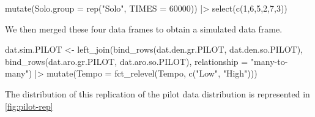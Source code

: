 \documentclass[
  bookmarksnumbered]{article}
\newenvironment{Shaded}{\begin{snugshade}}{\end{snugshade}}
\newcommand{\AttributeTok}[1]{\textcolor[rgb]{0.80,0.80,0.80}{#1}}
\newcommand{\DecValTok}[1]{\textcolor[rgb]{0.86,0.86,0.80}{#1}}
\newcommand{\FunctionTok}[1]{\textcolor[rgb]{0.94,0.94,0.56}{#1}}
\newcommand{\NormalTok}[1]{\textcolor[rgb]{0.80,0.80,0.80}{#1}}
\newcommand{\OtherTok}[1]{\textcolor[rgb]{0.94,0.94,0.56}{#1}}
\newcommand{\SpecialCharTok}[1]{\textcolor[rgb]{0.86,0.64,0.64}{#1}}
\newcommand{\StringTok}[1]{\textcolor[rgb]{0.80,0.58,0.58}{#1}}
\begin{document}
\begin{Shaded}
\begin{Highlighting}[]
  \FunctionTok{mutate}\NormalTok{(}\AttributeTok{Solo.group =} \FunctionTok{rep}\NormalTok{(}\StringTok{"Solo"}\NormalTok{, }\AttributeTok{TIMES =} \DecValTok{60000}\NormalTok{)) }\SpecialCharTok{|\textgreater{}}
  \FunctionTok{select}\NormalTok{(}\FunctionTok{c}\NormalTok{(}\DecValTok{1}\NormalTok{,}\DecValTok{6}\NormalTok{,}\DecValTok{5}\NormalTok{,}\DecValTok{2}\NormalTok{,}\DecValTok{7}\NormalTok{,}\DecValTok{3}\NormalTok{))}
\end{Highlighting}
\end{Shaded}

We then merged these four data frames to obtain a simulated data frame.

\begin{Shaded}
\begin{Highlighting}[]
\NormalTok{dat.sim.PILOT }\OtherTok{\textless{}{-}} \FunctionTok{left\_join}\NormalTok{(}\FunctionTok{bind\_rows}\NormalTok{(dat.den.gr.PILOT, dat.den.so.PILOT),}
                           \FunctionTok{bind\_rows}\NormalTok{(dat.aro.gr.PILOT, dat.aro.so.PILOT),}
                           \AttributeTok{relationship =} \StringTok{"many{-}to{-}many"}\NormalTok{) }\SpecialCharTok{|\textgreater{}} 
  \FunctionTok{mutate}\NormalTok{(}\AttributeTok{Tempo =} \FunctionTok{fct\_relevel}\NormalTok{(Tempo, }\FunctionTok{c}\NormalTok{(}\StringTok{"Low"}\NormalTok{, }\StringTok{"High"}\NormalTok{)))}
\end{Highlighting}
\end{Shaded}

The distribution of this replication of the pilot data distribution is represented in \ref{fig:pilot-rep}
\end{document}
